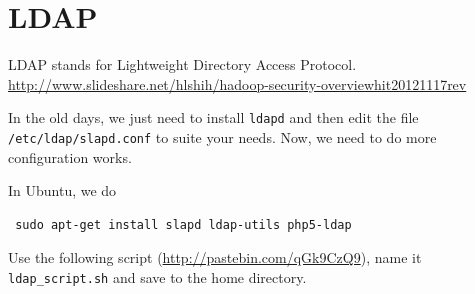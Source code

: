 \section{LDAP}
\label{sec:LDAP}

LDAP stands for Lightweight Directory Access Protocol. 
\url{http://www.slideshare.net/hlshih/hadoop-security-overviewhit20121117rev}

In the old days, we just need to install \verb!ldapd! and then edit the file
\verb!/etc/ldap/slapd.conf! to suite your needs. Now, we need to do more
configuration works.

In Ubuntu, we do
\begin{verbatim}
 sudo apt-get install slapd ldap-utils php5-ldap
\end{verbatim}

Use the following script (\url{http://pastebin.com/qGk9CzQ9}), name it
\verb!ldap_script.sh! and save to the home directory. 
